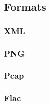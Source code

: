 \subsection{Formats}
 
\subsubsection{XML}

\subsubsection{PNG}
 
\subsubsection{Pcap}
 
\subsubsection{Flac}
 